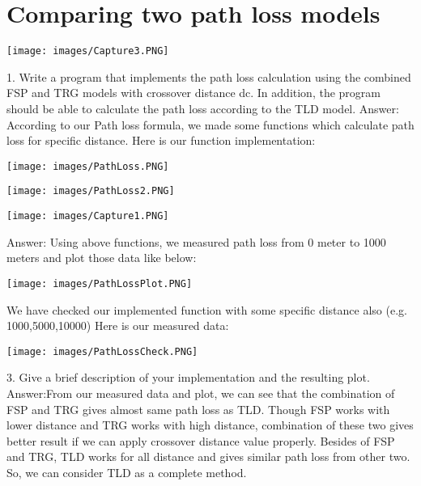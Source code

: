 \documentclass[10pt,a4paper]{article}
\begin{document}
\section{Comparing two path loss models}
\begin{center}
\texttt{[image: images/Capture3.PNG]}
\end{center}
1.  Write a program that implements the path loss calculation using the combined FSP and TRG models with crossover distance dc. In addition, the program should be able to calculate the path loss according to the TLD model.
\newline Answer: \newline
According to our Path loss formula, we made some functions which calculate path loss for specific distance.
\newline Here is our function implementation:
\begin{center}
\texttt{[image: images/PathLoss.PNG]}
\end{center}
\begin{center}
\texttt{[image: images/PathLoss2.PNG]}
\end{center}
\begin{center}
\texttt{[image: images/Capture1.PNG]}
\end{center}
Answer: \newline
Using above functions, we measured path loss from 0 meter to 1000 meters and plot those data like below:
\begin{center}
\texttt{[image: images/PathLossPlot.PNG]}
\end{center}
We have checked our implemented function with some specific distance also (e.g. 1000,5000,10000)
\newline Here is our measured data:
\begin{center}
\texttt{[image: images/PathLossCheck.PNG]}
\end{center}
3.  Give a brief description of your implementation and the resulting plot.\newline
Answer:\newline From our measured data and plot, we can see that the combination of FSP and TRG gives almost same path loss as TLD.
Though FSP works with lower distance and TRG works with high distance, combination of these two gives better result if we can apply crossover distance value properly.
\newline Besides of FSP and TRG, TLD works for all distance and gives similar path loss from other two. So, we can consider TLD  as a complete method.
\end{document}
